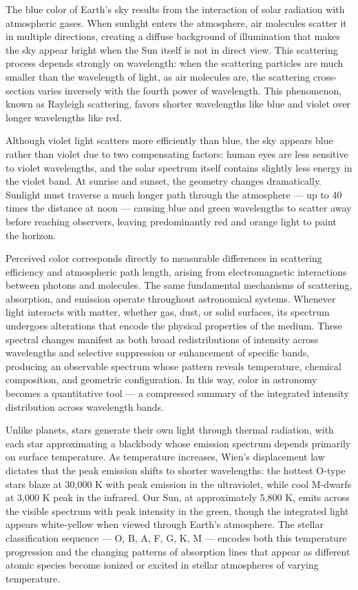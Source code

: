 The blue color of Earth's sky results from the interaction of solar radiation with atmospheric gases. When sunlight enters the atmosphere, air molecules scatter it in multiple directions, creating a diffuse background of illumination that makes the sky appear bright when the Sun itself is not in direct view. This scattering process depends strongly on wavelength: when the scattering particles are much smaller than the wavelength of light, as air molecules are, the scattering cross-section varies inversely with the fourth power of wavelength. This phenomenon, known as Rayleigh scattering, favors shorter wavelengths like blue and violet over longer wavelengths like red.

Although violet light scatters more efficiently than blue, the sky appears blue rather than violet due to two compensating factors: human eyes are less sensitive to violet wavelengths, and the solar spectrum itself contains slightly less energy in the violet band. At sunrise and sunset, the geometry changes dramatically. Sunlight must traverse a much longer path through the atmosphere — up to 40 times the distance at noon — causing blue and green wavelengths to scatter away before reaching observers, leaving predominantly red and orange light to paint the horizon.

Perceived color corresponds directly to measurable differences in scattering efficiency and atmospheric path length, arising from electromagnetic interactions between photons and molecules. The same fundamental mechanisms of scattering, absorption, and emission operate throughout astronomical systems. Whenever light interacts with matter, whether gas, dust, or solid surfaces, its spectrum undergoes alterations that encode the physical properties of the medium. These spectral changes manifest as both broad redistributions of intensity across wavelengths and selective suppression or enhancement of specific bands, producing an observable spectrum whose pattern reveals temperature, chemical composition, and geometric configuration. In this way, color in astronomy becomes a quantitative tool — a compressed summary of the integrated intensity distribution across wavelength bands.

Unlike planets, stars generate their own light through thermal radiation, with each star approximating a blackbody whose emission spectrum depends primarily on surface temperature. As temperature increases, Wien's displacement law dictates that the peak emission shifts to shorter wavelengths: the hottest O-type stars blaze at 30,000 K with peak emission in the ultraviolet, while cool M-dwarfs at 3,000 K peak in the infrared. Our Sun, at approximately 5,800 K, emits across the visible spectrum with peak intensity in the green, though the integrated light appears white-yellow when viewed through Earth's atmosphere. The stellar classification sequence — O, B, A, F, G, K, M — encodes both this temperature progression and the changing patterns of absorption lines that appear as different atomic species become ionized or excited in stellar atmospheres of varying temperature.

